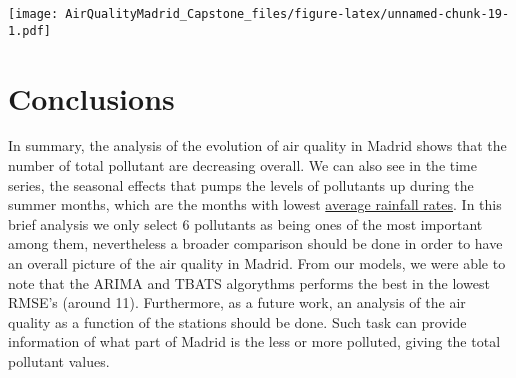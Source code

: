\documentclass[
]{article}
\begin{document}
\texttt{[image: AirQualityMadrid\_Capstone\_files/figure-latex/unnamed-chunk-19-1.pdf]}

\hypertarget{conclusions}{%
\section{Conclusions}\label{conclusions}}

In summary, the analysis of the evolution of air quality in Madrid shows
that the number of total pollutant are decreasing overall. We can also
see in the time series, the seasonal effects that pumps the levels of
pollutants up during the summer months, which are the months with lowest
\href{https://www.holiday-weather.com/madrid/averages/}{average rainfall
rates}. In this brief analysis we only select 6 pollutants as being ones
of the most important among them, nevertheless a broader comparison
should be done in order to have an overall picture of the air quality in
Madrid. From our models, we were able to note that the ARIMA and TBATS
algorythms performs the best in the lowest RMSE's (around 11).
Furthermore, as a future work, an analysis of the air quality as a
function of the stations should be done. Such task can provide
information of what part of Madrid is the less or more polluted, giving
the total pollutant values.
\end{document}
